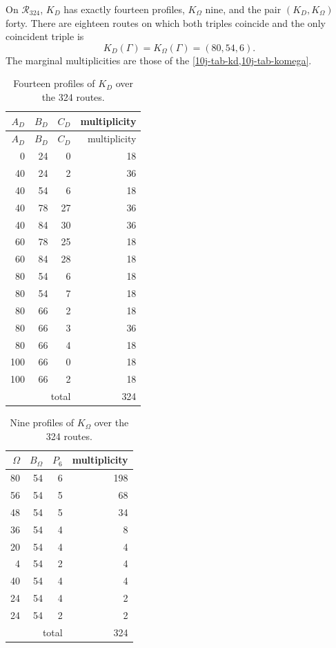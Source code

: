 \begin{theorem}
\label{10j-thm-censo-lectores}
On \(\mathcal R_{324}\), \(K_D\) has exactly fourteen profiles, \(K_\Omega\) nine, and the pair \((K_D,K_\Omega)\) forty. There are eighteen routes on which both triples coincide and the only coincident triple is
\begin{equation}
 K_D(\Gamma)=K_\Omega(\Gamma)=(80,54,6).
 \label{10j-eq-unica-coincidencia}
\end{equation}
The marginal multiplicities are those of the \cref{10j-tab-kd,10j-tab-komega}.
\end{theorem}

\begin{longtable}{@{}rrr r@{}}
\caption{Fourteen profiles of \(K_D\) over the 324 routes.}
\label{10j-tab-kd}\\
\toprule
\(A_D\)&\(B_D\)&\(C_D\)&multiplicity\\
\midrule
\endfirsthead
\toprule
\(A_D\)&\(B_D\)&\(C_D\)&multiplicity\\
\midrule
\endhead
0&24&0&18\\
40&24&2&36\\
40&54&6&18\\
40&78&27&36\\
40&84&30&36\\
60&78&25&18\\
60&84&28&18\\
80&54&6&18\\
80&54&7&18\\
80&66&2&18\\
80&66&3&36\\
80&66&4&18\\
100&66&0&18\\
100&66&2&18\\
\midrule
\multicolumn{3}{r}{total}&324\\
\bottomrule
\end{longtable}

\begin{table}[htbp]
\centering
\caption{Nine profiles of \(K_\Omega\) over the 324 routes.}
\label{10j-tab-komega}
\begin{tabular}{@{}rrr r@{}}
\toprule
\(\Omega\)&\(B_\Omega\)&\(P_6\)&multiplicity\\
\midrule
80&54&6&198\\
56&54&5&68\\
48&54&5&34\\
36&54&4&8\\
20&54&4&4\\
4&54&2&4\\
40&54&4&4\\
24&54&4&2\\
24&54&2&2\\
\midrule
\multicolumn{3}{r}{total}&324\\
\bottomrule
\end{tabular}
\end{table}


